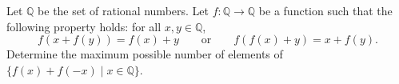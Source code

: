 Let $\mathbb{Q}$ be the set of rational numbers. Let $f \colon \mathbb{Q} \to \mathbb{Q}$ be a function such that the following property holds: for all $x, y \in \mathbb{Q}$,
\[
f(x + f(y)) = f(x) + y \qquad \text{or} \qquad f(f(x) + y) = x + f(y).
\]
Determine the maximum possible number of elements of $\{ f(x) + f(-x) \mid x \in \mathbb{Q} \}$.
